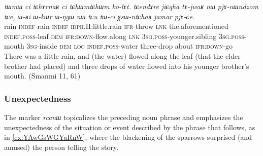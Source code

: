 \documentclass[oneside,a4paper,11pt]{article}
\newcommand{\ipa}[1]{\mbox{\phon\textit{#1}}} %
\begin{document}
\begin{exe}
\ex \label{ex:jiCqha}
 \gll \ipa{tɯmɯ} 	\ipa{ci} 	\ipa{tɕhɤrnaʁ} 	\ipa{ci} 	\ipa{tɕhɯmtɕhɯm} 	\ipa{ko-lɤt.} 	\ipa{tɕendɤre} 	\ipa{jiɕqha} 	\ipa{tɤ-jwaʁ} 	\ipa{nɯ} 	\ipa{pjɤ-nɯndzom} 	\ipa{tɕe,} 	\ipa{ɯ-ʁi} 	\ipa{ɯ-kɯr} 	\ipa{ɯ-ŋgɯ} 	\ipa{nɯ} 	\ipa{tɕu} 	\ipa{tɯ-ci} 	\ipa{χsɯ-ntɕhaʁ} 	\ipa{jamar} 	\ipa{pjɤ-ɕe.} \\
 rain \textsc{indef}  rain \textsc{indef} \textsc{idph}.II:little.rain \textsc{ifr}-throw \textsc{lnk} the.aforementioned \textsc{indef.poss}-leaf \textsc{dem} \textsc{ifr:down}-flow.along \textsc{lnk} \textsc{3sg.poss}-younger.sibling  \textsc{3sg.poss}-mouth \textsc{3sg}-inside \textsc{dem} \textsc{loc} \textsc{indef.poss}-water three-drop about \textsc{ifr:down}-go \\
 \glt There was a little rain, and (the water) flowed along the leaf (that the elder brother had placed) and three drops of water flowed into his younger brother's mouth. (Smanmi 11, 61)
\end{exe}

 \subsubsection{Unexpectedness}
The marker \ipa{rcanɯ} topicalizes the preceding noun phrase and emphasizes the unexpectedness of the situation or event described by the phrase that follows, as in \ref{ex:YAwGsWGYaRnW}, where the blackening of the sparrows surprised (and amused) the person telling the story.

\end{document}
